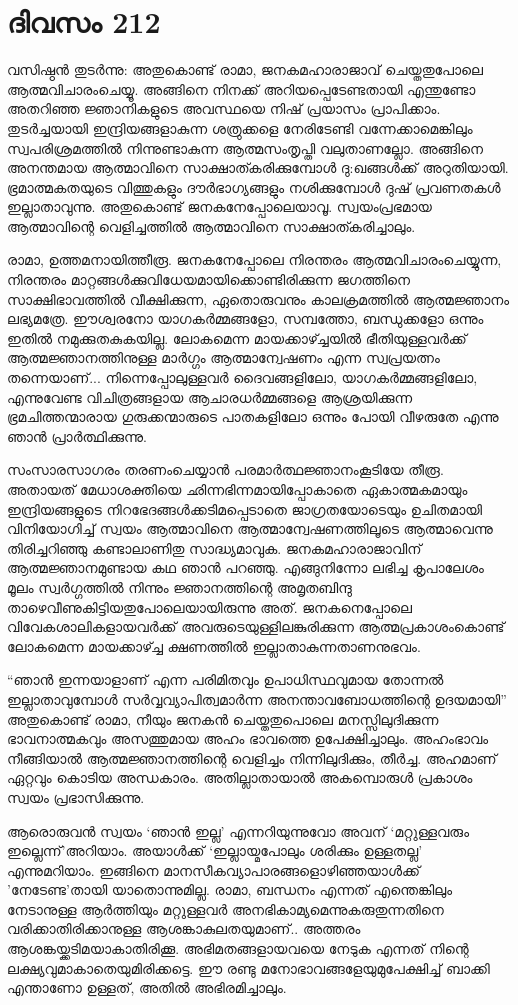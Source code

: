 \section{ദിവസം 212}


വസിഷ്ഠൻ തുടർന്നു: അതുകൊണ്ട് രാമാ, ജനകമഹാരാജാവ് ചെയ്തതുപോലെ ആത്മവിചാരംചെയ്യൂ. അങ്ങിനെ നിനക്ക് അറിയപ്പെടേണ്ടതായി എന്തുണ്ടോ അതറിഞ്ഞ ജ്ഞാനികളുടെ അവസ്ഥയെ നിഷ് പ്രയാസം പ്രാപിക്കാം. തുടർച്ചയായി ഇന്ദ്രിയങ്ങളാകുന്ന ശത്രുക്കളെ നേരിടേണ്ടി വന്നേക്കാമെങ്കിലും സ്വപരിശ്രമത്തിൽ നിന്നുണ്ടാകുന്ന ആത്മസംതൃപ്തി വലുതാണല്ലോ. അങ്ങിനെ അനന്തമായ ആത്മാവിനെ സാക്ഷാത്കരിക്കുമ്പോൾ ദു:ഖങ്ങൾക്ക് അറുതിയായി. ഭ്രമാത്മകതയുടെ വിത്തുകളും ദൗർഭാഗ്യങ്ങളും നശിക്കുമ്പോള്‍ ദുഷ് പ്രവണതകൾ ഇല്ലാതാവുന്നു. അതുകൊണ്ട് ജനകനേപ്പോലെയാവൂ. സ്വയംപ്രഭമായ ആത്മാവിന്റെ വെളിച്ചത്തിൽ ആത്മാവിനെ സാക്ഷാത്കരിച്ചാലും.

രാമാ, ഉത്തമനായിത്തീരൂ. ജനകനേപ്പോലെ നിരന്തരം ആത്മവിചാരംചെയ്യുന്ന,  നിരന്തരം മാറ്റങ്ങൾക്കുവിധേയമായിക്കൊണ്ടിരിക്കുന്ന ജഗത്തിനെ സാക്ഷിഭാവത്തില്‍ വീക്ഷിക്കുന്ന, ഏതൊരുവനും കാലക്രമത്തിൽ ആത്മജ്ഞാനം ലഭ്യമത്രേ. ഈശ്വരനോ യാഗകർമ്മങ്ങളോ, സമ്പത്തോ, ബന്ധുക്കളോ ഒന്നും ഇതിൽ നമുക്കുതകുകയില്ല. ലോകമെന്ന മായക്കാഴ്ച്ചയിൽ ഭീതിയുള്ളവർക്ക് ആത്മജ്ഞാനത്തിനുള്ള മാർഗ്ഗം ആത്മാന്വേഷണം എന്ന സ്വപ്രയത്നം തന്നെയാണ്‌... നിന്നെപ്പോലുള്ളവർ ദൈവങ്ങളിലോ, യാഗകർമ്മങ്ങളിലോ, എന്നുവേണ്ട വിചിത്രങ്ങളായ ആചാരധർമ്മങ്ങളെ ആശ്രയിക്കുന്ന ഭ്രമചിത്തന്മാരായ ഗുരുക്കന്മാരുടെ പാതകളിലോ ഒന്നും പോയി വീഴരുതേ എന്നു ഞാൻ പ്രാർത്ഥിക്കുന്നു.

സംസാരസാഗരം തരണംചെയ്യാൻ പരമാർത്ഥജ്ഞാനംകൂടിയേ തീരൂ. അതായത് മേധാശക്തിയെ ഛിന്നഭിന്നമായിപ്പോകാതെ ഏകാത്മകമായും ഇന്ദ്രിയങ്ങളുടെ നിറഭേദങ്ങൾക്കടിമപ്പെടാതെ ജാഗ്രതയോടെയും ഉചിതമായി വിനിയോഗിച്ച് സ്വയം ആത്മാവിനെ ആത്മാന്വേഷണത്തിലൂടെ ആത്മാവെന്നു തിരിച്ചറിഞ്ഞു കണ്ടാലാണിതു സാദ്ധ്യമാവുക. ജനകമഹാരാജാവിന്‌ ആത്മജ്ഞാനമുണ്ടായ കഥ ഞാൻ പറഞ്ഞു. എങ്ങുനിന്നോ ലഭിച്ച കൃപാലേശം മൂലം സ്വർഗ്ഗത്തിൽ നിന്നും ജ്ഞാനത്തിന്റെ അമൃതബിന്ദു താഴെവീണുകിട്ടിയതുപോലെയായിരുന്നു അത്. ജനകനെപ്പോലെ വിവേകശാലികളായവർക്ക് അവരുടെയുള്ളിലങ്കുരിക്കുന്ന ആത്മപ്രകാശംകൊണ്ട് ലോകമെന്ന മായക്കാഴ്ച്ച ക്ഷണത്തിൽ ഇല്ലാതാകുന്നതാണനുഭവം.

“ഞാൻ ഇന്നയാളാണ്‌ എന്ന പരിമിതവും ഉപാധിസ്ഥവുമായ തോന്നൽ ഇല്ലാതാവുമ്പോൾ സർവ്വവ്യാപിത്വമാർന്ന അനന്താവബോധത്തിന്റെ ഉദയമായി” അതുകൊണ്ട് രാമാ, നീയും ജനകൻ ചെയ്തതുപൊലെ മനസ്സിലുദിക്കുന്ന ഭാവനാത്മകവും അസത്തുമായ അഹം ഭാവത്തെ ഉപേക്ഷിച്ചാലും. അഹംഭാവം നീങ്ങിയാൽ ആത്മജ്ഞാനത്തിന്റെ വെളിച്ചം നിന്നിലുദിക്കും, തീർച്ച. അഹമാണ്‌ ഏറ്റവും കൊടിയ അന്ധകാരം. അതില്ലാതായാൽ അകമ്പൊരുൾ പ്രകാശം സ്വയം പ്രഭാസിക്കുന്നു.

ആരൊരുവൻ സ്വയം ‘ഞാൻ ഇല്ല’ എന്നറിയുന്നുവോ അവന്‌ ‘മറ്റുള്ളവരും ഇല്ലെന്ന്’അറിയാം. അയാൾക്ക് ‘ഇല്ലായ്മപോലും ശരിക്കും ഉള്ളതല്ല’ എന്നുമറിയാം. ഇങ്ങിനെ മാനസീകവ്യാപാരങ്ങളൊഴിഞ്ഞയാൾക്ക് 'നേടേണ്ട'തായി യാതൊന്നുമില്ല. രാമാ, ബന്ധനം എന്നത് എന്തെങ്കിലും നേടാനുള്ള ആർത്തിയും മറ്റുള്ളവർ അനഭികാമ്യമെന്നുകരുതുന്നതിനെ വരിക്കാതിരിക്കാനുള്ള ആശങ്കാകുലതയുമാണ്‌.. അത്തരം ആശങ്കയ്ക്കടിമയാകാതിരിക്കൂ. അഭിമതങ്ങളായവയെ നേടുക എന്നത് നിന്റെ ലക്ഷ്യവുമാകാതെയുമിരിക്കട്ടെ. ഈ രണ്ടു മനോഭാവങ്ങളേയുമുപേക്ഷിച്ച് ബാക്കി എന്താണോ ഉള്ളത്, അതിൽ അഭിരമിച്ചാലും.

